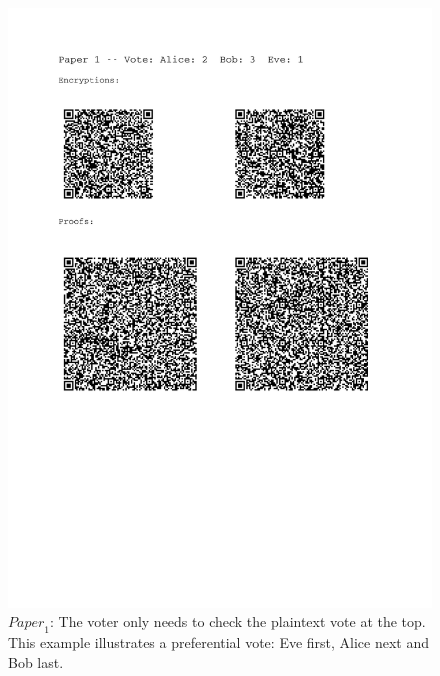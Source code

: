 \documentclass[12pt,a4paper]{article}
\theoremstyle{definition}
\newcommand{\Paper}{\mathit{Paper}}
\begin{document}
\begin{figure}
	\centering
	\includegraphics[scale=0.6, trim=2.5cm 10cm 3.1cm 0cm, clip=true]{paper1.pdf}
	\caption{$\Paper_1$: The voter only needs to check the plaintext vote at the top.  This example illustrates a preferential vote: Eve first, Alice next and Bob last.}
	\label{fig:paper1}
\end{figure}
\end{document}
